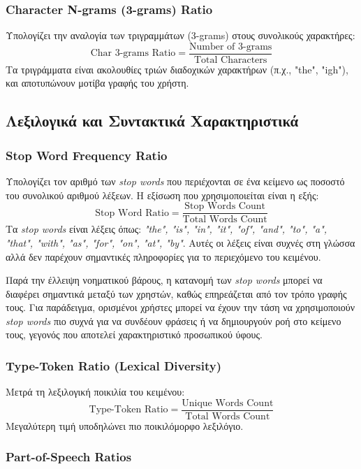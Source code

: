 \subsubsection{Character N-grams (3-grams) Ratio}

 Υπολογίζει την αναλογία των τριγραμμάτων (3-grams) στους συνολικούς χαρακτήρες:
\[
\text{Char 3-grams Ratio} = \frac{\text{Number of 3-grams}}{\text{Total Characters}}
\]
Τα τριγράμματα είναι ακολουθίες τριών διαδοχικών χαρακτήρων (π.χ., "the", "igh"), και αποτυπώνουν μοτίβα γραφής του χρήστη.

\subsection{Λεξιλογικά και Συντακτικά Χαρακτηριστικά}

\subsubsection{Stop Word Frequency Ratio}

Υπολογίζει τον αριθμό των \textit{stop words} που περιέχονται σε ένα κείμενο ως ποσοστό του συνολικού αριθμού λέξεων. Η εξίσωση που χρησιμοποιείται είναι η εξής:
\[
\text{Stop Word Ratio} = \frac{\text{Stop Words Count}}{\text{Total Words Count}}
\]
Τα \textit{stop words} είναι λέξεις όπως: \textit{"the", "is", "in", "it", "of", "and", "to", "a", "that", "with", "as", "for", "on", "at", "by"}. Αυτές οι λέξεις είναι συχνές στη γλώσσα αλλά δεν παρέχουν σημαντικές πληροφορίες για το περιεχόμενο του κειμένου.

Παρά την έλλειψη νοηματικού βάρους, η κατανομή των \textit{stop words} μπορεί να διαφέρει σημαντικά μεταξύ των χρηστών, καθώς επηρεάζεται από τον τρόπο γραφής τους. Για παράδειγμα, ορισμένοι χρήστες μπορεί να έχουν την τάση να χρησιμοποιούν \textit{stop words} πιο συχνά για να συνδέουν φράσεις ή να δημιουργούν ροή στο κείμενο τους, γεγονός που αποτελεί χαρακτηριστικό προσωπικού ύφους.

\subsubsection{Type-Token Ratio (Lexical Diversity)}

Μετρά τη λεξιλογική ποικιλία του κειμένου:
\[
\text{Type-Token Ratio} = \frac{\text{Unique Words Count}}{\text{Total Words Count}}
\]
Μεγαλύτερη τιμή υποδηλώνει πιο ποικιλόμορφο λεξιλόγιο.

\subsubsection{Part-of-Speech Ratios}

